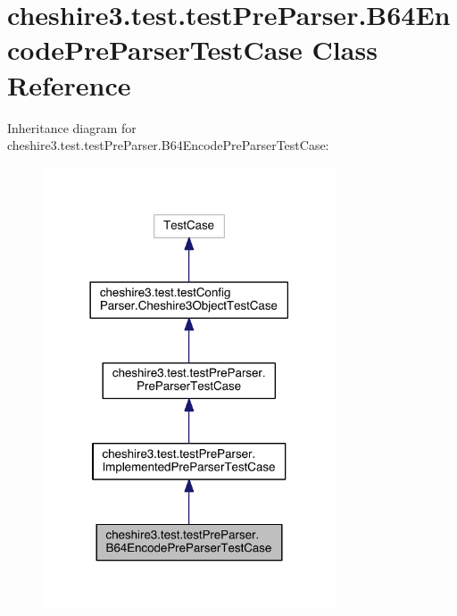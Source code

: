 \hypertarget{classcheshire3_1_1test_1_1test_pre_parser_1_1_b64_encode_pre_parser_test_case}{\section{cheshire3.\-test.\-test\-Pre\-Parser.\-B64\-Encode\-Pre\-Parser\-Test\-Case Class Reference}
\label{classcheshire3_1_1test_1_1test_pre_parser_1_1_b64_encode_pre_parser_test_case}
}


Inheritance diagram for cheshire3.\-test.\-test\-Pre\-Parser.\-B64\-Encode\-Pre\-Parser\-Test\-Case\-:
\nopagebreak
\begin{figure}[H]
\begin{center}
\leavevmode
\includegraphics[width=246pt]{classcheshire3_1_1test_1_1test_pre_parser_1_1_b64_encode_pre_parser_test_case__inherit__graph}
\end{center}
\end{figure}



